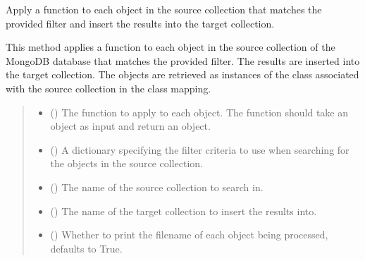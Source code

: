 \documentclass[letterpaper,10pt,english]{sphinxmanual}
\begin{document}
\begin{fulllineitems}
\begin{fulllineitems}
\label{\detokenize{forensicfit.database.database:forensicfit.database.database.Database.map_to}}
\pysigstartsignatures
{}
\pysigstopsignatures
\sphinxAtStartPar
Apply a function to each object in the source collection that matches the provided filter
and insert the results into the target collection.

\sphinxAtStartPar
This method applies a function to each object in the source collection of the MongoDB database
that matches the provided filter. The results are inserted into the target collection. The
objects are retrieved as instances of the class associated with the source collection in the
class mapping.
\begin{quote}\begin{description}
\begin{itemize}
\item {} 
\sphinxAtStartPar
{} () \textendash{} The function to apply to each object. The function should take an object as input and
return an object.

\item {} 
\sphinxAtStartPar
{} () \textendash{} A dictionary specifying the filter criteria to use when searching for the objects in
the source collection.

\item {} 
\sphinxAtStartPar
{} () \textendash{} The name of the source collection to search in.

\item {} 
\sphinxAtStartPar
{} () \textendash{} The name of the target collection to insert the results into.

\item {} 
\sphinxAtStartPar
{} (\sphinxstyleliteralemphasis{\sphinxupquote{, }}) \textendash{} Whether to print the filename of each object being processed, defaults to True.


\end{itemize}
\end{description}
\end{quote}
\end{fulllineitems}
\end{fulllineitems}
\end{document}
